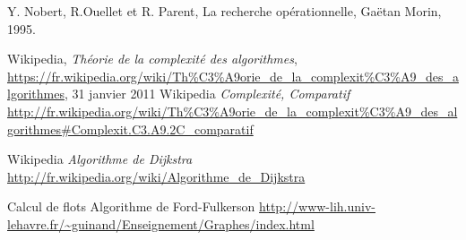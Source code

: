 \begin{thebibliography}{9}

    Y. Nobert, R.Ouellet et R. Parent,
    La recherche opérationnelle,
    Gaëtan Morin,
    1995.

    Wikipedia,
    \emph{Théorie de la complexité des algorithmes},
    \url{https://fr.wikipedia.org/wiki/Th\%C3\%A9orie_de_la_complexit\%C3\%A9_des_algorithmes},
    31 janvier 2011
  Wikipedia
  \emph{Complexité, Comparatif}
  \url{http://fr.wikipedia.org/wiki/Th\%C3\%A9orie_de_la_complexit\%C3\%A9_des_algorithmes\#Complexit.C3.A9.2C_comparatif}

  Wikipedia
  \emph{Algorithme de Dijkstra}
  \url{http://fr.wikipedia.org/wiki/Algorithme_de_Dijkstra}

Calcul de flots
Algorithme de Ford-Fulkerson
\url{http://www-lih.univ-lehavre.fr/~guinand/Enseignement/Graphes/index.html}

\end{thebibliography}
